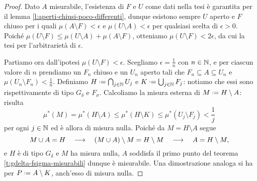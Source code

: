\begin{proof}
	Dato $A$ misurabile, l'esistenza di $F$ e $U$ come dati nella tesi è garantita per il lemma \ref{l:aperti-chiusi-poco-differenti}, dunque esistono sempre $U$ aperto e $F$ chiuso per i quali $\mu(A\setminus F)<\epsilon$ e $\mu(U\setminus A)<\epsilon$ per qualsiasi scelta di $\epsilon>0$.
	Poich\'e $\mu(U\setminus F)\leq\mu(U\setminus A)+\mu(A\setminus F)$, otteniamo $\mu(U\setminus F)<2\epsilon$, da cui la tesi per l'arbitrarietà di $\epsilon$.

	Partiamo ora dall'ipotesi $\mu(U\setminus F)<\epsilon$.
	Scegliamo $\epsilon=\frac1{n}$ con $n\in\mathbb{N}$, e per ciascun valore di $n$ prendiamo un $F_n$ chiuso e un $U_n$ aperto tali che $F_n\subseteq A\subseteq U_n$ e $\mu(U_n\setminus F_n)<\frac1{n}$.
	Definiamo $H\defeq\bigcap_{j\in\N}U_j$ e $K\defeq\bigcup_{j\in\N}F_j$: notiamo che essi sono rispettivamente di tipo $G_\delta$ e $F_\sigma$.
	Calcoliamo la misura esterna di $M\defeq H\setminus A$: risulta
	\begin{equation}
		\mu^*(M)=\mu^*(H\setminus A)\leq\mu^*(H\setminus K)\leq\mu^*(U_j\setminus F_j)<\frac1{j}
	\end{equation}
	per ogni $j\in\mathbb{N}$ ed è allora di misura nulla.
	Poich\'e da $M=H\setminus A$ segue
	\begin{equation}
		M\cup A=H\quad\longrightarrow\quad (M\cup A)\setminus M=H\setminus M\quad\longrightarrow\quad A=H\setminus M,
	\end{equation}
	e $H$ è di tipo $G_\delta$ e $M$ ha misura nulla, $A$ soddisfa il primo punto del teorema \ref{t:gdelta-fsigma-misurabili} dunque è misurabile.
	Una dimostrazione analoga si ha per $P\defeq A\setminus K$, anch'esso di misura nulla.
\end{proof}
